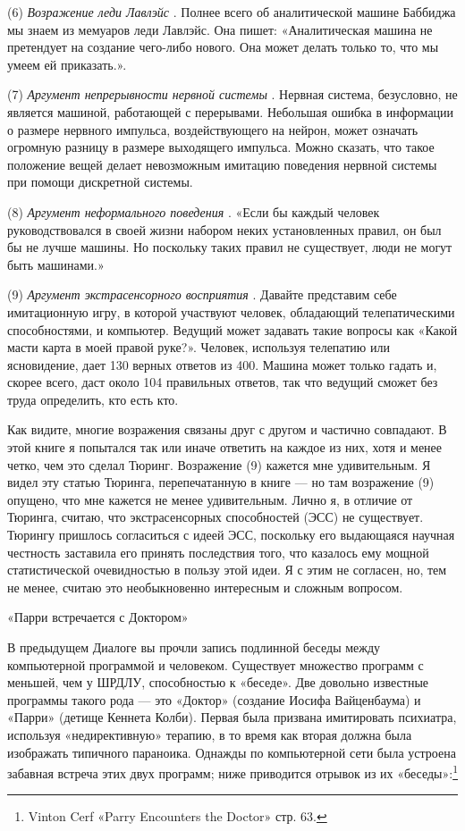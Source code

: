 \documentclass[../main.tex]{subfiles}
\begin{document}
(6) \emph{Возражение леди Лавлэйс} . Полнее всего об аналитической машине Баббиджа мы знаем из мемуаров леди Лавлэйс. Она пишет: «Аналитическая машина не претендует на создание чего-либо нового. Она может делать только то, что мы умеем ей приказать.».

(7) \emph{Аргумент непрерывности нервной системы} . Нервная система, безусловно, не является машиной, работающей с перерывами. Небольшая ошибка в информации о размере нервного импульса, воздействующего на нейрон, может означать огромную разницу в размере выходящего импульса. Можно сказать, что такое положение вещей делает невозможным имитацию поведения нервной системы при помощи дискретной системы.

(8) \emph{Аргумент неформального поведения} . «Если бы каждый человек руководствовался в своей жизни набором неких установленных правил, он был бы не лучше машины. Но поскольку таких правил не существует, люди не могут быть машинами.»

(9) \emph{Аргумент экстрасенсорного восприятия} . Давайте представим себе имитационную игру, в которой участвуют человек, обладающий телепатическими способностями, и компьютер. Ведущий может задавать такие вопросы как «Какой масти карта в моей правой руке?». Человек, используя телепатию или ясновидение, дает 130 верных ответов из 400. Машина может только гадать и, скорее всего, даст около 104 правильных ответов, так что ведущий сможет без труда определить, кто есть кто.

Как видите, многие возражения связаны друг с другом и частично совпадают. В этой книге я попытался так или иначе ответить на каждое из них, хотя и менее четко, чем это сделал Тюринг. Возражение (9) кажется мне удивительным. Я видел эту статью Тюринга, перепечатанную в книге --- но там возражение (9) опущено, что мне кажется не менее удивительным. Лично я, в отличие от Тюринга, считаю, что экстрасенсорных способностей (ЭСС) не существует. Тюрингу пришлось согласиться с идеей ЭСС, поскольку его выдающаяся научная честность заставила его принять последствия того, что казалось ему мощной статистической очевидностью в пользу этой идеи. Я с этим не согласен, но, тем не менее, считаю это необыкновенно интересным и сложным вопросом.

«Парри встречается с Доктором»

В предыдущем Диалоге вы прочли запись подлинной беседы между компьютерной программой и человеком. Существует множество программ с меньшей, чем у ШРДЛУ, способностью к «беседе». Две довольно известные программы такого рода --- это «Доктор» (создание Иосифа Вайценбаума) и «Парри» (детище Кеннета Колби). Первая была призвана имитировать психиатра, используя «недирективную» терапию, в то время как вторая должна была изображать типичного параноика. Однажды по компьютерной сети была устроена забавная встреча этих двух программ; ниже приводится отрывок из их «беседы»:\footnote{Vinton Cerf «Parry Encounters the Doctor» стр. 63.}
\end{document}
